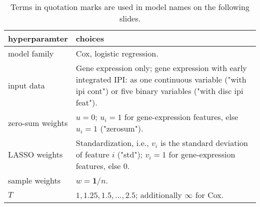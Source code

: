 \begin{table}[ht]
    \centering
    \begin{tabular}{p{}p{}}
        \hline
        hyperparamter & choices \\ 
        \hline
        model family & Cox, logistic regression. \\
        input data & Gene expression only; gene expression with early integrated IPI: 
            as one continuous variable ("with ipi cont") or five binary variables ("with disc ipi feat"). \\ 
        zero-sum weights & $u = 0$; $u_i = 1$ for gene-expression features, 
            else $u_i = 1$ ("zerosum"). \\
        LASSO weights & Standardization, i.e., $v_i$ is the standard deviation of feature $i$ ("std"); 
            $v_i = 1$ for gene-expression features, else $0$. \\
        sample weights & $w = \mathbf{1}/n$. \\
        $T$ & $1, 1.25, 1.5, \ldots, 2.5$; additionally $\infty$ for Cox. \\
       \hline
    \end{tabular}
    \caption{Terms in quotation marks are used in model names on the following slides.}
    \label{fig:hyperpara-schmitz}
    \end{table}
